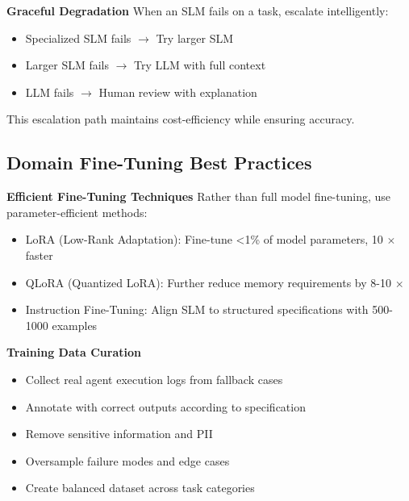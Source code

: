 \documentclass[11pt,a4paper]{article}
\begin{document}
\textbf{Graceful Degradation} \cite{nvidia2025}
When an SLM fails on a task, escalate intelligently:
\begin{itemize}
    \item Specialized SLM fails $\rightarrow$ Try larger SLM
    \item Larger SLM fails $\rightarrow$ Try LLM with full context
    \item LLM fails $\rightarrow$ Human review with explanation
\end{itemize}
This escalation path maintains cost-efficiency while ensuring accuracy.

\subsection{Domain Fine-Tuning Best Practices}
\textbf{Efficient Fine-Tuning Techniques} \cite{nvidia2025}
Rather than full model fine-tuning, use parameter-efficient methods:
\begin{itemize}
    \item LoRA (Low-Rank Adaptation): Fine-tune <1\% of model parameters, 10 $\times$ faster
    \item QLoRA (Quantized LoRA): Further reduce memory requirements by 8-10 $\times$ 
    \item Instruction Fine-Tuning: Align SLM to structured specifications with 500-1000 examples
\end{itemize}
\textbf{Training Data Curation} \cite{nvidia2025}
\begin{itemize}
    \item Collect real agent execution logs from fallback cases
    \item Annotate with correct outputs according to specification
    \item Remove sensitive information and PII
    \item Oversample failure modes and edge cases
    \item Create balanced dataset across task categories
\end{itemize}
\end{document}
